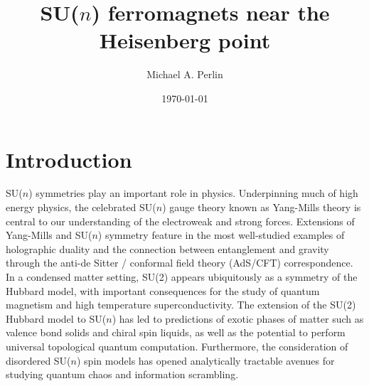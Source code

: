 \documentclass[nofootinbib,notitlepage,11pt]{revtex4-2}
\newcommand{\1}{\mathds{1}}
\begin{document}

\title{SU($n$) ferromagnets near the Heisenberg point}
\author{Michael A. Perlin}
\date{\today}

\maketitle

\tableofcontents

\section{Introduction}

SU($n$) symmetries play an important role in physics.  Underpinning
much of high energy physics, the celebrated SU($n$) gauge theory known
as Yang-Mills theory is central to our understanding of the
electroweak and strong forces.  Extensions of Yang-Mills and SU($n$)
symmetry feature in the most well-studied examples of holographic
duality\cite{maldacena1999largen} and the connection between
entanglement and gravity\cite{ryu2006holographic} through the anti-de
Sitter / conformal field theory (AdS/CFT) correspondence.  In a
condensed matter setting, SU(2) appears ubiquitously as a symmetry of
the Hubbard model, with important consequences for the study of
quantum magnetism and high temperature
superconductivity\cite{lee2006doping}.  The extension of the SU(2)
Hubbard model to SU($n$) has led to predictions of exotic phases of
matter such as valence bond solids\cite{read1989valencebond,
  rokhsar1990quadratic, kaul2012lattice, hermele2011topological} and
chiral spin liquids\cite{hermele2009mott, hermele2011topological,
  chen2016syntheticgaugefield, nataf2016chiral}, as well as the
potential to perform universal topological quantum
computation\cite{freedman2004class, nayak2008nonabelian}.
Furthermore, the consideration of disordered SU($n$) spin models has
opened analytically tractable avenues for studying quantum chaos and
information scrambling\cite{sachdev1993gapless,
  bentsen2019integrable}.
\end{document}
